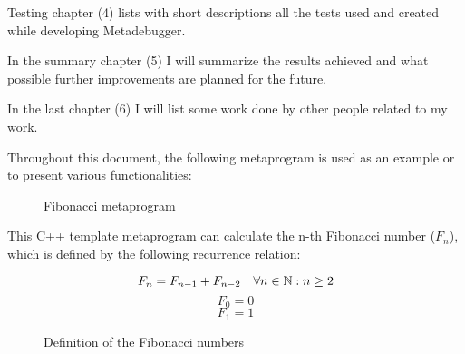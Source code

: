 Testing chapter (4) lists with short descriptions all the tests used and
created while developing Metadebugger.

In the summary chapter (5) I will summarize the results achieved and what
possible further improvements are planned for the future.

In the last chapter (6) I will list some work done by other people related to
my work.

Throughout this document, the following metaprogram is used as an example or to
present various functionalities:

\begin{figure}[H]
    \caption{Fibonacci metaprogram}
\end{figure}

This C++ template metaprogram can calculate the n-th Fibonacci number
(\(F_n\)), which is defined by the following recurrence relation:

\begin{figure}[H]
    \[
        F_n = F_{n-1} + F_{n-2} \quad \forall n \in \mathbb{N}: n \geq 2 \\
    \]
    \[
        F_0 = 0
    \]
    \[
        F_1 = 1
    \]
    \caption{Definition of the Fibonacci numbers}
\end{figure}
